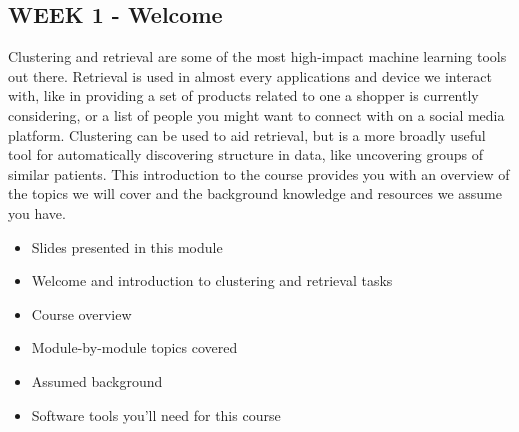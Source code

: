 \subsection{WEEK 1 - Welcome}
Clustering and retrieval are some of the most high-impact machine learning tools out there. Retrieval is used in almost every applications and device we interact with, like in providing a set of products related to one a shopper is currently considering, or a list of people you might want to connect with on a social media platform. Clustering can be used to aid retrieval, but is a more broadly useful tool for automatically discovering structure in data, like uncovering groups of similar patients.
This introduction to the course provides you with an overview of the topics we will cover and the background knowledge and resources we assume you have.

\begin{itemize}
\item Slides presented in this module
\item Welcome and introduction to clustering and retrieval tasks
\item Course overview
\item Module-by-module topics covered
\item Assumed background
\item Software tools you'll need for this course
\end{itemize}


